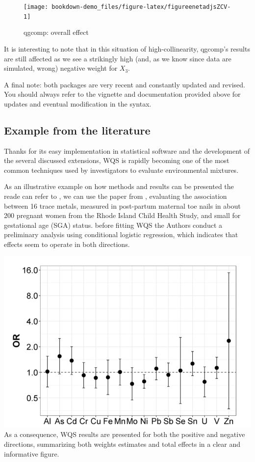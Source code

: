 \documentclass[
]{book}
\begin{document}
\begin{figure}[H]

{\centering \texttt{[image: bookdown-demo\_files/figure-latex/figureenetadjsZCV-1]} 

}

\caption{qgcomp: overall effect}\label{fig:figureenetadjsZCV}
\end{figure}

It is interesting to note that in this situation of high-collinearity, qgcomp's results are still affected as we see a strikingly high (and, as we know since data are simulated, wrong) negative weight for \(X_3\).

A final note: both packages are very recent and constantly updated and revised. You should always refer to the vignette and documentation provided above for updates and eventual modification in the syntax.

\hypertarget{example-from-the-literature}{%
\subsection{Example from the literature}\label{example-from-the-literature}}

Thanks for its easy implementation in statistical software and the development of the several discussed extensions, WQS is rapidly becoming one of the most common techniques used by investigators to evaluate environmental mixtures.

As an illustrative example on how methods and results can be presented the reade can refer to , we can use the paper from \citet{deyssenroth2018intrauterine}, evaluating the association between 16 trace metals, measured in post-partum maternal toe nails in about 200 pregnant women from the Rhode Island Child Health Study, and small for gestational age (SGA) status. before fitting WQS the Authors conduct a preliminary analysis using conditional logistic regression, which indicates that effects seem to operate in both directions.

\includegraphics{images/deyslog.png}
As a consequence, WQS results are presented for both the positive and negative directions, summarizing both weights estimates and total effects in a clear and informative figure.
\end{document}
